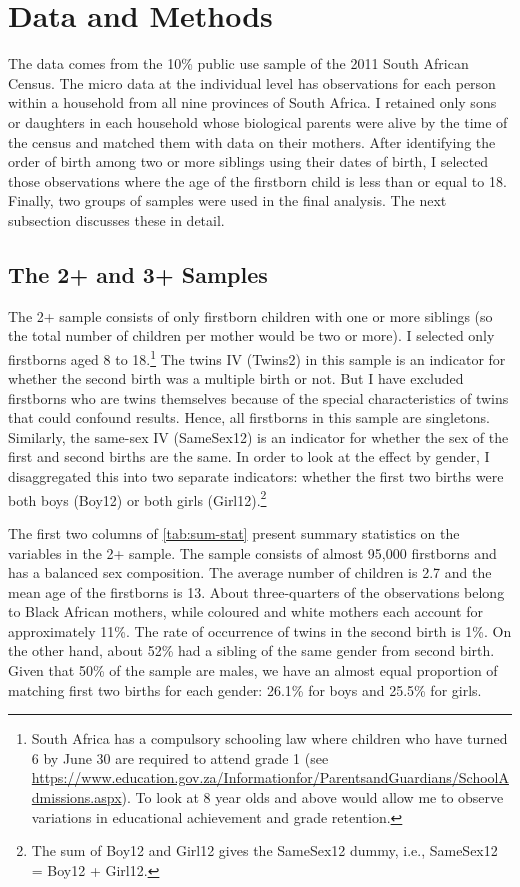 
\section{Data and Methods}
\label{section:data}

The data comes from the 10\% public use sample of the 2011 South African Census. The micro data at the individual level has observations for each person within a household from all nine provinces of South Africa. I retained only sons or daughters in each household whose biological parents were alive by the time of the census and matched them with data on their mothers. After identifying the order of birth among two or more siblings using their dates of birth, I selected those observations where the age of the firstborn child is less than or equal to 18. Finally, two groups of samples were used in the final analysis. The next subsection discusses these in detail.

\subsection{The 2+ and 3+ Samples}



The 2+ sample consists of only firstborn children with one or more siblings (so the total number of children per mother would be two or more). I selected only firstborns aged 8 to 18.\footnote{ South Africa has a compulsory schooling law where children who have turned 6 by June 30 are required to attend grade 1 (see \url{https://www.education.gov.za/Informationfor/ParentsandGuardians/SchoolAdmissions.aspx}). To look at 8 year olds and above would allow me to observe variations in educational achievement and grade retention. }  The twins IV (Twins2) in this sample is an indicator for whether the second birth was a multiple birth or not. But I have excluded firstborns who are twins themselves because of the special characteristics of twins that could confound results. Hence, all firstborns in this sample are singletons. Similarly, the same-sex IV (SameSex12) is an indicator for whether the sex of the first and second births are the same. In order to look at the effect by gender, I disaggregated this into two separate indicators: whether the first two births were both boys (Boy12) or both girls (Girl12).\footnote{ The sum of Boy12 and Girl12 gives the SameSex12 dummy, i.e., SameSex12 = Boy12 + Girl12. }  

The first two columns of \autoref{tab:sum-stat} present summary statistics on the variables in the 2+ sample. The sample consists of almost 95,000 firstborns and has a balanced sex composition. The average number of children is 2.7 and the mean age of the firstborns is 13. About three-quarters of the observations belong to Black African mothers, while coloured and white mothers each account for approximately 11\%. The rate of occurrence of twins in the second birth is 1\%. On the other hand, about 52\% had a sibling of the same gender from second birth. Given that 50\% of the sample are males, we have an almost equal proportion of matching first two births for each gender: 26.1\% for boys and 25.5\% for girls. 

